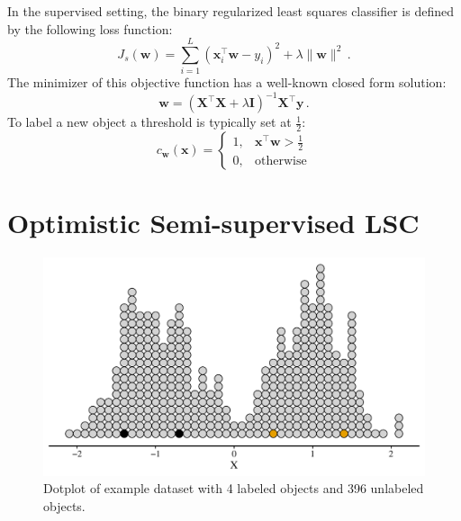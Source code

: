 \documentclass[conference,a4paper,10pt]{IEEEtran}\usepackage[]{graphicx}\usepackage[]{color}
\makeatletter
\def\maxwidth{ %
  \ifdim\Gin@nat@width>\linewidth
    \linewidth
  \else
    \Gin@nat@width
  \fi
}
\newenvironment{knitrout}{}{} %
\makeatother
\begin{document}
In the supervised setting, the binary regularized least squares classifier is defined by the following loss function:
\begin{equation}
J_s(\mathbf{w}) = \sum_{i=1}^L (\mathbf{x}_i^\top \mathbf{w}-y_i)^2 + \lambda \|\mathbf{w} \|^2 \,. \label{eq:supervisedobjective}
\end{equation}
The minimizer of this objective function has a well-known closed form solution:
\begin{equation}
\mathbf{w} = \left( \mathbf{X}^\top \mathbf{X}  + \lambda \mathbf{I} \right)^{-1} \mathbf{X}^\top \mathbf{y} \,. \label{eq:olssolution}
\end{equation}
To label a new object a threshold is typically set at $\tfrac{1}{2}$:
$$
c_\mathbf{w}(\mathbf{x}) = 
\begin{cases}
    1, & \mathbf{x}^\top \mathbf{w}>\tfrac{1}{2}\\
    0,              & \text{otherwise}
\end{cases}
$$

\section{Optimistic Semi-supervised LSC}

\begin{knitrout}
\color{fgcolor}\begin{figure}
\includegraphics[width=\maxwidth]{figure/attractionexample-1} \caption[Dotplot of example dataset with 4 labeled objects and 396 unlabeled objects]{Dotplot of example dataset with 4 labeled objects and 396 unlabeled objects.}\label{fig:attractionexample}
\end{figure}


\end{knitrout}
\end{document}

